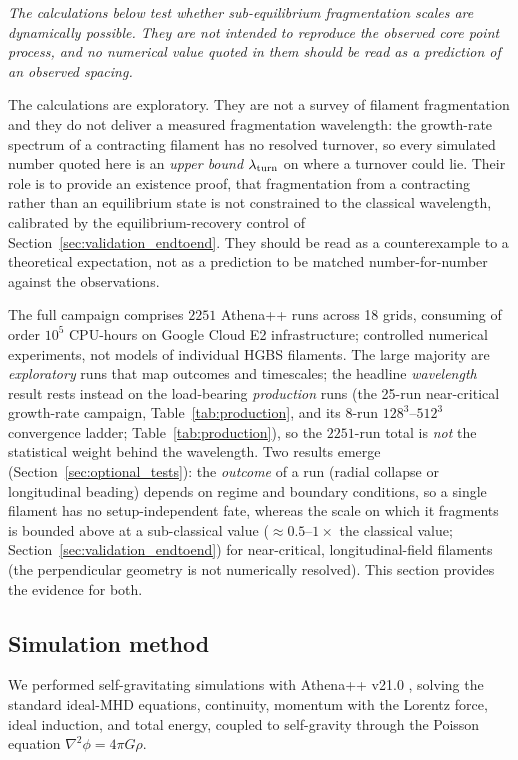\documentclass[usenatbib,twoside,twocolumn]{mnras}
\begin{document}
\smallskip\noindent\emph{The calculations below test whether sub-equilibrium fragmentation scales are dynamically possible. They are not intended to reproduce the observed core point process, and no numerical value quoted in them should be read as a prediction of an observed spacing.}

\noindent The calculations are exploratory. They are not a survey of filament fragmentation and they do not deliver a measured fragmentation wavelength: the growth-rate spectrum of a contracting filament has no resolved turnover, so every simulated number quoted here is an \emph{upper bound} $\lambda_{\rm turn}$ on where a turnover could lie. Their role is to provide an existence proof, that fragmentation from a contracting rather than an equilibrium state is not constrained to the classical wavelength, calibrated by the equilibrium-recovery control of Section~\ref{sec:validation_endtoend}. They should be read as a counterexample to a theoretical expectation, not as a prediction to be matched number-for-number against the observations.

The full campaign comprises $2251$ Athena++ runs across 18 grids, consuming of order $10^5$ CPU-hours on Google Cloud E2 infrastructure; controlled numerical experiments, not models of individual HGBS filaments. The large majority are \emph{exploratory} runs that map outcomes and timescales; the headline \emph{wavelength} result rests instead on the load-bearing \emph{production} runs (the 25-run near-critical growth-rate campaign, Table~\ref{tab:production}, and its 8-run $128^3$--$512^3$ convergence ladder; Table~\ref{tab:production}), so the $2251$-run total is \emph{not} the statistical weight behind the wavelength. Two results emerge (Section~\ref{sec:optional_tests}): the \emph{outcome} of a run (radial collapse or longitudinal beading) depends on regime and boundary conditions, so a single filament has no setup-independent fate, whereas the scale on which it fragments is bounded above at a sub-classical value ($\approx0.5$--$1\times$ the classical value; Section~\ref{sec:validation_endtoend}) for near-critical, longitudinal-field filaments (the perpendicular geometry is not numerically resolved). This section provides the evidence for both.

\subsection{Simulation method}

We performed self-gravitating simulations with Athena++ v21.0 \citep{Stone2020}, solving the standard ideal-MHD equations, continuity, momentum with the Lorentz force, ideal induction, and total energy, coupled to self-gravity through the Poisson equation $\nabla^2\phi=4\pi G\rho$.
\end{document}
